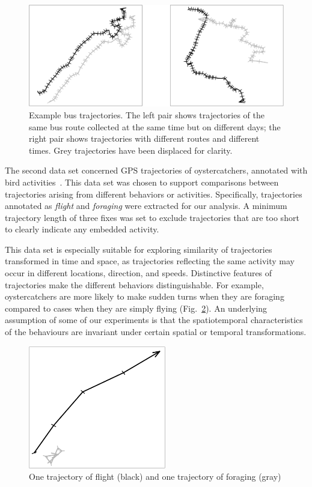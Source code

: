 \documentclass{interact}
\begin{document}
\begin{figure}[ht]
	 \centering
	 \includegraphics[width=120mm]{figures/busRoutesComparison}
	 \caption{Example bus trajectories. The left pair shows trajectories of the same bus route collected at the same time but on different days; the right pair shows trajectories with different routes and different times. Grey trajectories have been displaced for clarity.}
	 \label{fig:eg_bus}
\end{figure}

The second data set concerned GPS trajectories of oystercatchers, annotated with bird activities~\citep{shamoun2012sensor}. This data set was chosen to support comparisons between trajectories arising from different behaviors or activities. Specifically, trajectories annotated as \textit{flight} and \textit{foraging} were extracted for our analysis. A minimum trajectory length of three fixes was set to exclude trajectories that are too short to clearly indicate any embedded activity.

This data set is especially suitable for exploring similarity of trajectories transformed in time and space, as trajectories reflecting the same activity may occur in different locations, direction, and speeds. Distinctive features of trajectories make the different behaviors distinguishable. For example, oystercatchers are more likely to make sudden turns when they are foraging compared to cases when they are simply flying (Fig.~\ref{fig:illu_flight_forage}). An underlying assumption of some of our experiments is that the spatiotemporal characteristics of the behaviours are invariant under certain spatial or temporal transformations. 

\begin{figure}[ht]
	\centering
	\includegraphics[width=60mm]{figures/birdComparison}
	\caption{One trajectory of flight (black) and one trajectory of foraging (gray)}
	\label{fig:illu_flight_forage}
\end{figure}
\end{document}
